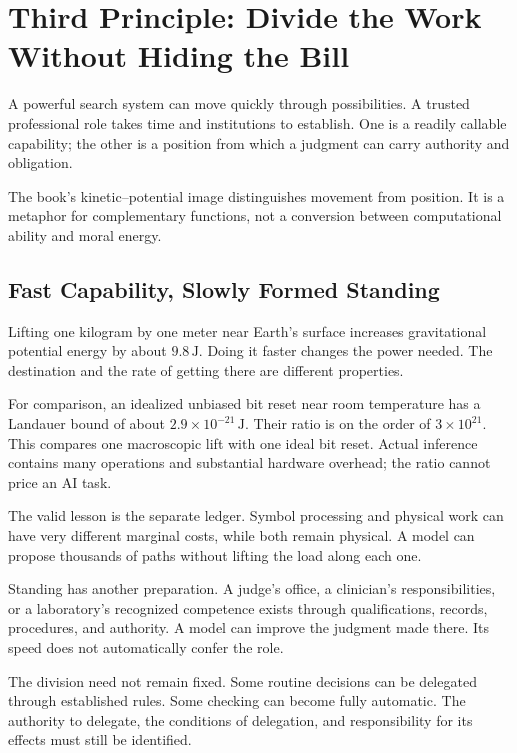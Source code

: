 \section{Third Principle: Divide the Work Without Hiding the Bill}

A powerful search system can move quickly through possibilities. A trusted professional role takes time and institutions to establish. One is a readily callable capability; the other is a position from which a judgment can carry authority and obligation.

The book's kinetic--potential image distinguishes movement from position. It is a metaphor for complementary functions, not a conversion between computational ability and moral energy.

\subsection{Fast Capability, Slowly Formed Standing}

Lifting one kilogram by one meter near Earth's surface increases gravitational potential energy by about $9.8\,\mathrm J$. Doing it faster changes the power needed. The destination and the rate of getting there are different properties.

For comparison, an idealized unbiased bit reset near room temperature has a Landauer bound of about $2.9\times10^{-21}\,\mathrm J$. Their ratio is on the order of $3\times10^{21}$. This compares one macroscopic lift with one ideal bit reset. Actual inference contains many operations and substantial hardware overhead; the ratio cannot price an AI task.

The valid lesson is the separate ledger. Symbol processing and physical work can have very different marginal costs, while both remain physical. A model can propose thousands of paths without lifting the load along each one.

Standing has another preparation. A judge's office, a clinician's responsibilities, or a laboratory's recognized competence exists through qualifications, records, procedures, and authority. A model can improve the judgment made there. Its speed does not automatically confer the role.

The division need not remain fixed. Some routine decisions can be delegated through established rules. Some checking can become fully automatic. The authority to delegate, the conditions of delegation, and responsibility for its effects must still be identified.

